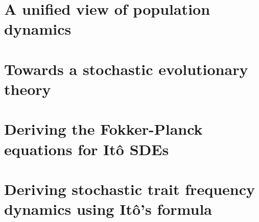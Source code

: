 \documentclass[twoside, 12pt]{iiser-thesis}
\begin{document}
\chapter{A unified view of population dynamics}\label{chap_unification}

\chapter{Towards a stochastic evolutionary theory}\label{chap_stochasticity}

% 
% 

\cleardoublepage
{}
\appendix
{}

\renewcommand{\chaptername}{Appendix} 
\chapter{Deriving the Fokker-Planck equations for It\^{o} SDEs}\label{App_SDE_FPE}

\chapter{Deriving stochastic trait frequency dynamics using It\^{o}'s formula}\label{App_density_to_freq}


\printbibliography[title=References]
\end{document}
